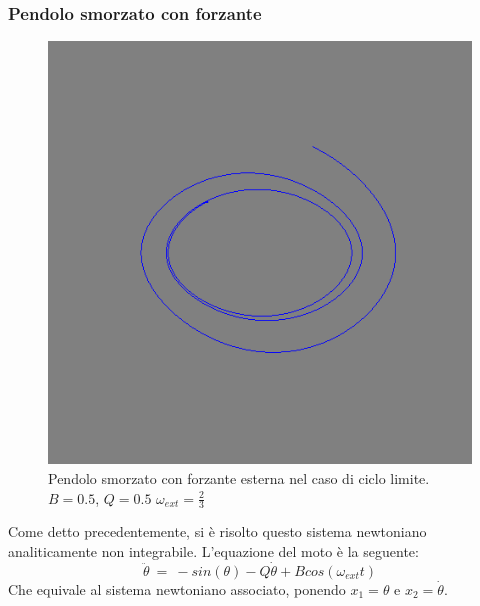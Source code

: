 \subsubsection{Pendolo smorzato con forzante}
\begin{figure}[!h]
  \centering
  \includegraphics[width = 0.5\columnwidth]{pendolo_limite.png}
  \caption{Pendolo smorzato con forzante esterna nel caso di ciclo limite. $B = 0.5$, $Q= 0.5$ $\omega_{ext} = \tfrac{2}{3}$}
 \end{figure}


Come detto precedentemente, si è risolto questo sistema newtoniano analiticamente non integrabile. L'equazione del moto è la seguente:
$$
  \ddot{\theta} \ = \ -sin(\theta) -Q \dot{\theta}+B cos(\omega_{ext} t)
$$
Che equivale al sistema newtoniano associato, ponendo $ x_1 = \theta $ e $x_2 = \dot{\theta}$.

